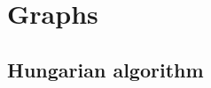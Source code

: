 \documentclass{article}
\begin{document}
\tableofcontents

\newpage

\section{Graphs}
\subsection{Hungarian algorithm}
\inputminted[mathescape, breaklines, tabsize=4, frame=lines, linenos=true]{c++}{./graphs/hungarian-algorithm/hungarian-algorithm.cpp}
\end{document}
